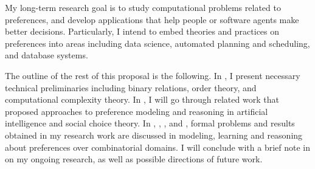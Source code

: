 My long-term research goal is to study computational problems related to preferences, and 
develop applications that help people or software agents make better decisions.
Particularly, I intend to embed theories and practices on preferences into areas including
data science, automated planning and scheduling, and database systems.

The outline of the rest of this proposal is the following. 
In , I present necessary technical preliminaries
including binary relations, order theory, and computational complexity theory.
In , I will go through related work that proposed
approaches to preference modeling and reasoning
in artificial intelligence and social choice theory.
In ,  , , and ,
formal problems and results obtained in my research work are discussed
in modeling, learning and reasoning about preferences over combinatorial domains.
I will conclude with a brief note in  on my ongoing research,
as well as possible directions of future work.
